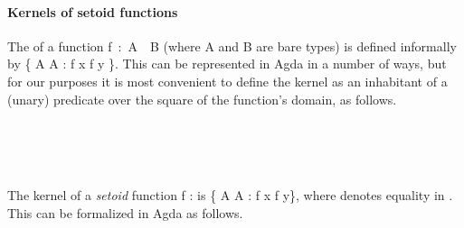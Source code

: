 \paragraph*{Kernels of setoid functions}
The  of a function \ab f~\as :~\ab A~~\ab B (where \ab A and \ab B are bare types) is defined
informally by \{  \ab A  \ab A \as : \ab f \ab x \as{=} \ab f \ab y \}.
This can be represented in Agda in a number of ways, but for our purposes it is most
convenient to define the kernel as an inhabitant of a (unary) predicate over the square of
the function's domain, as follows.

\begin{code}%
\>[0]\<%
\\
\>[0]\AgdaSpace{}%
\AgdaSymbol{:}\AgdaSpace{}%
\AgdaSymbol{\{}\AgdaSpace{}%
\AgdaSymbol{:}\AgdaSpace{}%
\AgdaSpace{}%
\AgdaSymbol{\}\{}\AgdaSpace{}%
\AgdaSymbol{:}\AgdaSpace{}%
\AgdaSpace{}%
\AgdaSymbol{\}}\AgdaSpace{}%
\AgdaSpace{}%
\AgdaSpace{}%
\AgdaSpace{}%
\AgdaSpace{}%
\AgdaSpace{}%
\AgdaSymbol{(}\AgdaSpace{}%
\AgdaSpace{}%
\AgdaSymbol{)}\AgdaSpace{}%
\AgdaSpace{}%
\AgdaSpace{}%
\AgdaSymbol{(}\AgdaSpace{}%
\AgdaSpace{}%
\AgdaSymbol{)}\AgdaSpace{}%
\<%
\\
\>[0]\AgdaSpace{}%
\AgdaSpace{}%
\AgdaSpace{}%
\AgdaSymbol{(}\AgdaSpace{}%
\AgdaOperator{\AgdaInductiveConstructor{,}}\AgdaSpace{}%
\AgdaSymbol{)}\AgdaSpace{}%
\AgdaSymbol{=}\AgdaSpace{}%
\AgdaSpace{}%
\AgdaSpace{}%
\AgdaSpace{}%
\AgdaSpace{}%
\<%
\\
\>[0]\<%
\end{code}
The kernel of a \emph{setoid} function \ab f \as :    is \{  \ab A  \ab A \as : \ab f  \ab x  \ab f  \ab y\},
where  denotes equality in . This can be formalized in Agda as follows.

